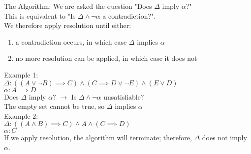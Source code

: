 \documentclass[../../lecture_notes.tex]{subfiles}
\begin{document}
\begin{center} \begin{minipage}{0.8\textwidth}
The Algorithm:
We are asked the question "Does $\Delta$ imply $\alpha$?"\\
This is equivalent to "Is $\Delta  \land \neg \alpha$ a contradiction?".\\
We therefore apply resolution until either:
\begin{enumerate} [itemsep=0mm]
	\item a contradiction occurs, in which case $\Delta$ implies $\alpha$
	\item no more resolution can be applied, in which case it does not
\end{enumerate}
Example 1:\\
\indent $\Delta: ((A \lor \neg B) \implies C) \land (C \implies D \lor \neg E) \land (E \lor D)$\\
\indent $\alpha: A \implies D$\\
Does $\Delta$ imply $\alpha$? $\rightarrow$ Is $\Delta \land \neg \alpha$ unsatisfiable?\\
\indent The empty set cannot be true, so $\Delta$ implies $\alpha$\\
Example 2:\\
\indent $\Delta: ((A \land B) \implies C) \land A \land (C \implies D)$\\
\indent $\alpha: C$\\
If we apply resolution, the algorithm will terminate; therefore, $\Delta$ does not imply $\alpha$.
\end{minipage}%
\begin{minipage}{0.2\textwidth} \end{minipage}\end{center}
\end{document}

